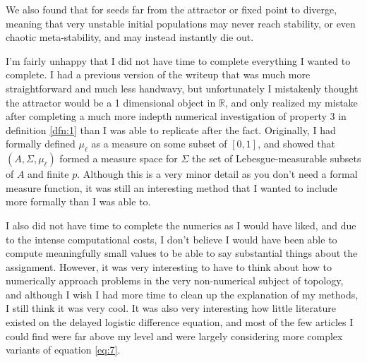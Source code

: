 \documentclass[11pt, letterpaper]{article}
\begin{document}
We also found that for seeds far from the attractor or fixed point to diverge, meaning that very unstable initial populations may never reach stability, or even chaotic meta-stability, and may instead instantly die out.

I'm fairly unhappy that I did not have time to complete everything I wanted to complete. I had a previous version of the writeup that was much more straightforward and much less handwavy, but unfortunately I mistakenly thought the attractor would be a 1 dimensional object in $\mathbb{R}$, and only realized my mistake after completing a much more indepth numerical investigation of property 3 in definition \ref{dfn:1} than I was able to replicate after the fact. Originally, I had formally defined $\mu_\ell $ as a measure on some subset of $[0,1]$, and showed that $(A,\Sigma ,\mu_\ell )$ formed a measure space for $\Sigma $ the set of Lebesgue-measurable subsets of $A$ and finite $p$. Although this is a very minor detail as you don't need a formal measure function, it was still an interesting method that I wanted to include more formally than I was able to.

I also did not have time to complete the numerics as I would have liked, and due to the intense computational costs, I don't believe I would have been able to compute meaningfully small values to be able to say substantial things about the assignment. However, it was very interesting to have to think about how to numerically approach problems in the very non-numerical subject of topology, and although I wish I had more time to clean up the explanation of my methods, I still think it was very cool. It was also very interesting how little literature existed on the delayed logistic difference equation, and most of the few articles I could find were far above my level and were largely considering more complex variants of equation \eqref{eq:7}.
\appendix
\end{document}
